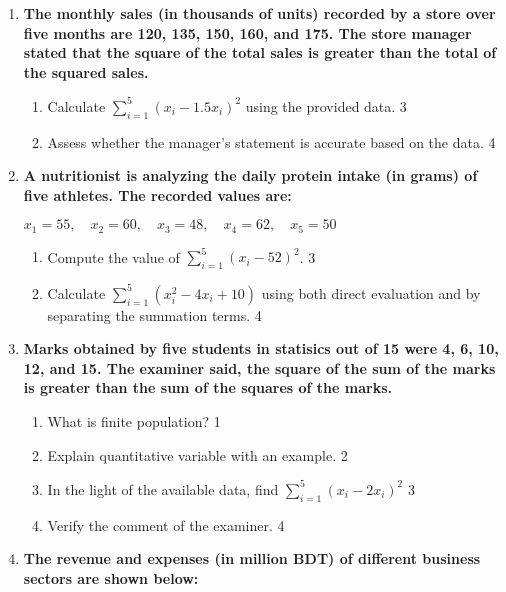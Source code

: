\documentclass[a4paper,oneside]{book}
\begin{document}
\begin{enumerate}
  
  \item
\textbf{The monthly sales (in thousands of units) recorded by a store over 
five months are 120, 135, 150, 160, and 175. The store manager 
stated that the square of the total sales is greater than the total of 
the squared sales.}

\begin{enumerate}
    \item  
    Calculate $\displaystyle \sum_{i=1}^5 (x_i - 1.5x_i)^2$ using the 
    provided data. \hfill 3
    \item
    Assess whether the manager’s statement is accurate based on the data. \hfill 4
\end{enumerate}

  \item  
  \textbf{A nutritionist is analyzing the daily protein intake (in grams) of five athletes.  
  The recorded values are:}  
  \begin{center}
  $x_1 = 55,\quad x_2 = 60,\quad x_3 = 48,\quad x_4 = 62,\quad x_5 = 50$
  \end{center}

  \begin{enumerate}
    \item  
    Compute the value of $\displaystyle \sum_{i=1}^5 (x_i - 52)^2$. \hfill 3

    \item  
    Calculate $\displaystyle \sum_{i=1}^5 (x_i^2 - 4x_i + 10)$ using both direct evaluation and by separating the summation terms. \hfill 4
  \end{enumerate}

 \item
	  \textbf{Marks obtained by five students in statisics out of 15 were 4, 6, 10, 12, and 15. The examiner said, the square of the sum of the marks is greater than the sum of the squares of the marks.} 
  
  \begin{enumerate}
    \item
	What is finite population? \hfill 1
    \item
	Explain quantitative variable with an example. \hfill 2
    \item  
	In the light of the available data, find $\displaystyle \sum_{i=1}^5 (x_i-2x_i)^2$ \hfill 3
    \item
	Verify the comment of the examiner. \hfill 4
  \end{enumerate}
  
  \item
\textbf{The revenue and expenses (in million BDT) of different business sectors are shown below:}


\end{enumerate}
\end{document}
